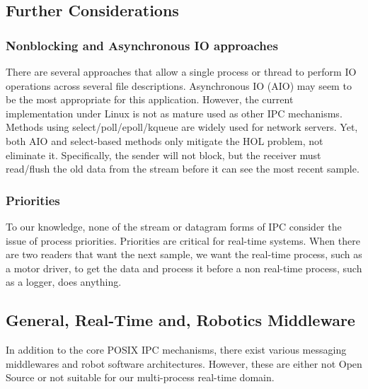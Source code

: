 \documentclass[letterpaper]{IEEEtran}
\begin{document}

\subsection{Further Considerations}

\subsubsection{Nonblocking and Asynchronous IO approaches} There are
several approaches that allow a single process or thread to perform IO
operations across several file descriptions.  Asynchronous IO (AIO)
may seem to be the most appropriate for this application. However, the
current implementation under Linux is not as mature used as other IPC
mechanisms.  Methods using select/poll/epoll/kqueue are widely used
for network servers. Yet, both AIO and select-based methods only
mitigate the HOL problem, not eliminate it.  Specifically, the sender
will not block, but the receiver must read/flush the old data from the
stream before it can see the most recent sample.

\subsubsection{Priorities}
To our knowledge, none of the stream or datagram forms of IPC consider
the issue of process priorities. Priorities are critical for real-time systems.
When there are two readers that want the next sample, we want the
real-time process, such as a motor driver, to get the data and process
it before a non real-time process, such as a logger, does anything.

\subsection{General, Real-Time and, Robotics Middleware}

In addition to the core POSIX IPC mechanisms, there exist various
messaging middlewares and robot software architectures. However, these
are either not Open Source or not suitable for our multi-process
real-time domain.
\end{document}
